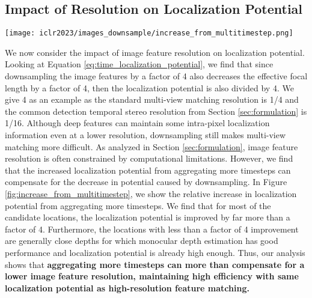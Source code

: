 \documentclass[runningheads, hyperfootnotes=false]{article}
\begin{document}
\subsection{Impact of Resolution on Localization Potential}\label{sec:theory_res}
\begin{figure*}[t]
  \centering
  \vspace{-3.5em}
  \texttt{[image: iclr2023/images\_downsample/increase\_from\_multitimestep.png]}
  \captionsetup{aboveskip=0pt}\captionsetup{belowskip=0pt}\caption{Visualization of relative increase in localization potential from using multiple timesteps. Note that each camera heatmap has a different scale.}
  \label{fig:increase_from_multitimestep}
\end{figure*} We now consider the impact of image feature resolution on localization potential. Looking at Equation \ref{eq:time_localization_potential}, we find that since downsampling the image features by a factor of 4 also decreases the effective focal length by a factor of 4, then the localization potential is also divided by 4. We give 4 as an example as the standard multi-view matching resolution is 1/4 \citep{yao2018mvsnet,Bae2021MultiViewDE} and the common detection temporal stereo resolution from Section \ref{sec:formulation} is 1/16. Although deep features can maintain some intra-pixel localization information even at a lower resolution, downsampling still makes multi-view matching more difficult. As analyzed in Section \ref{sec:formulation}, image feature resolution is often constrained by computational limitations. However, we find that the increased localization potential from aggregating more timesteps can compensate for the decrease in potential caused by downsampling. In Figure \ref{fig:increase_from_multitimestep}, we show the relative increase in localization potential from aggregating more timesteps. We find that for most of the candidate locations, the localization potential is improved by far more than a factor of 4. Furthermore, the locations with less than a factor of 4 improvement are generally close depths for which monocular depth estimation has good performance and localization potential is already high enough. Thus, our analysis shows that \textbf{aggregating more timesteps can more than compensate for a lower image feature resolution, maintaining high efficiency with same localization potential as high-resolution feature matching.} 
\end{document}
